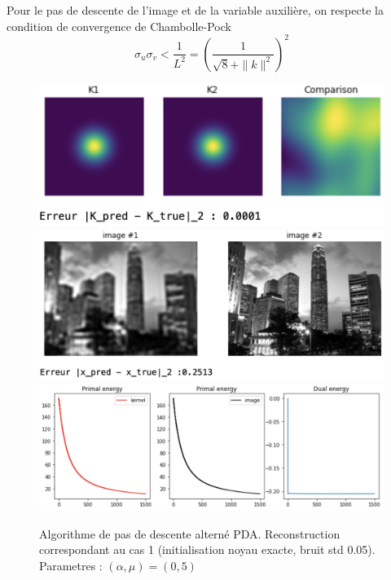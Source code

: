 \documentclass[a4paper]{article}
\begin{document}
Pour le pas de descente de l'image et de la variable auxilière, on respecte la condition de convergence de Chambolle-Pock
\[
\sigma_u \sigma_v <\frac{1}{L^2} =\left(\frac{1}{\sqrt{8} + \| k \|^2} \right)^2
\]

\begin{figure}[h]
\includegraphics[scale=0.8]{figures/algov-cas1-kernel}
\includegraphics[scale=0.6]{figures/algov-cas1-image}
\includegraphics[scale=0.6]{figures/algov-cas1-energy}
\caption{Algorithme de pas de descente alterné PDA. Reconstruction correspondant au cas 1  (initialisation noyau exacte, bruit std 0.05). Parametres : $(\alpha,\mu) =(0,5)$}
\end{figure}
\end{document}
